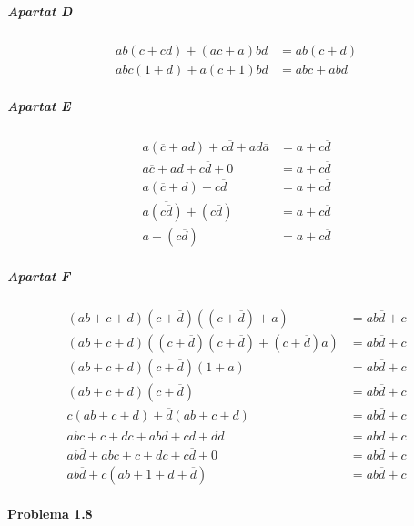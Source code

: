 \subparagraph{Apartat D} \begin{align*}
  ab\left(c + cd\right) + \left(ac + a\right)bd &= ab\left(c + d\right) \\
  abc\left(1 + d\right) + a\left(c + 1\right)bd &= abc + abd
\end{align*}

\subparagraph{Apartat E} \begin{align*}
  a\left(\overline{c} + ad\right) + c\overline{d} + ad\overline{a} &= a + c\overline{d} \\
  a\overline{c} + ad + c\overline{d} + 0 &= a + c\overline{d} \\
  a\left(\overline{c} + d\right) + c\overline{d} &= a + c\overline{d} \\
  a\overline{\left(c\overline{d}\right)} + \left(c\overline{d}\right) &= a + c\overline{d} \\
  a + \left(c\overline{d}\right) &= a + c\overline{d}
\end{align*}

\subparagraph{Apartat F} \begin{align*}
  \left(ab + c + d\right)\left(c + \overline{d}\right)\left(\left(c + \overline{d}\right) + a\right) &= ab\overline{d} + c \\
  \left(ab + c + d\right)\left(\left(c + \overline{d}\right)\left(c + \overline{d}\right) + \left(c + \overline{d}\right)a\right) &= ab\overline{d} + c \\
  \left(ab + c + d\right)\left(c + \overline{d}\right)\left(1 + a\right) &= ab\overline{d} + c \\
  \left(ab + c + d\right)\left(c + \overline{d}\right) &= ab\overline{d} + c \\
  c\left(ab + c + d\right) + \overline{d}\left(ab + c + d\right) &= ab\overline{d} + c \\
  abc + c + dc + ab\overline{d} + c\overline{d} + d\overline{d} &= ab\overline{d} + c \\
  ab\overline{d} + abc + c + dc + c\overline{d} + 0 &= ab\overline{d} + c \\
  ab\overline{d} + c\left(ab + 1 + d + \overline{d}\right) &= ab\overline{d} + c
\end{align*}

\finishpage


\startpage
\paragraph{Problema 1.8}

